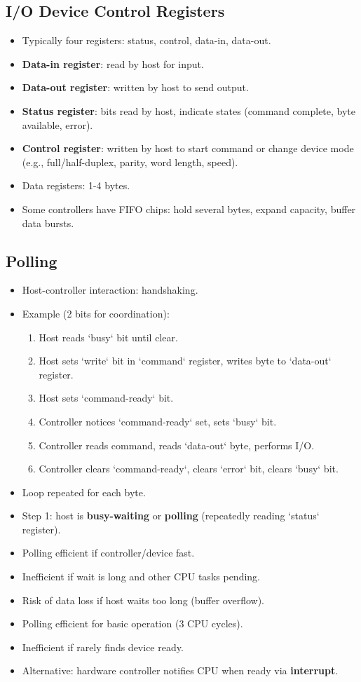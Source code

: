 \subsection{I/O Device Control Registers}
\begin{itemize}
    \item Typically four registers: status, control, data-in, data-out.
    \item \textbf{Data-in register}: read by host for input.
    \item \textbf{Data-out register}: written by host to send output.
    \item \textbf{Status register}: bits read by host, indicate states (command complete, byte available, error).
    \item \textbf{Control register}: written by host to start command or change device mode (e.g., full/half-duplex, parity, word length, speed).
    \item Data registers: 1-4 bytes.
    \item Some controllers have FIFO chips: hold several bytes, expand capacity, buffer data bursts.
\end{itemize}

\subsection{Polling}
\begin{itemize}
    \item Host-controller interaction: handshaking.
    \item Example (2 bits for coordination):
    \begin{enumerate}
        \item Host reads `busy` bit until clear.
        \item Host sets `write` bit in `command` register, writes byte to `data-out` register.
        \item Host sets `command-ready` bit.
        \item Controller notices `command-ready` set, sets `busy` bit.
        \item Controller reads command, reads `data-out` byte, performs I/O.
        \item Controller clears `command-ready`, clears `error` bit, clears `busy` bit.
    \end{enumerate}
    \item Loop repeated for each byte.
    \item Step 1: host is \textbf{busy-waiting} or \textbf{polling} (repeatedly reading `status` register).
    \item Polling efficient if controller/device fast.
    \item Inefficient if wait is long and other CPU tasks pending.
    \item Risk of data loss if host waits too long (buffer overflow).
    \item Polling efficient for basic operation (3 CPU cycles).
    \item Inefficient if rarely finds device ready.
    \item Alternative: hardware controller notifies CPU when ready via \textbf{interrupt}.
\end{itemize}

